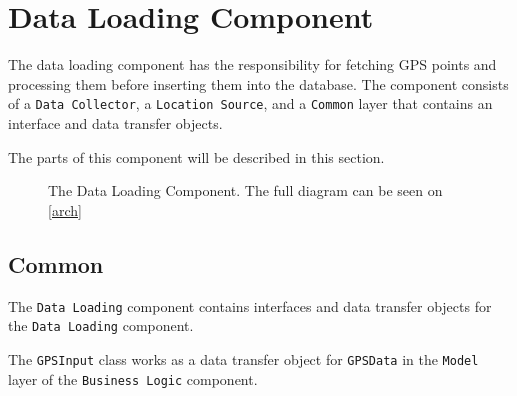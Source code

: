 \section{Data Loading Component}\label{arch:data_loading_component}
The data loading component has the responsibility for fetching GPS points and processing them before inserting them into the database.
The component consists of a \texttt{Data Collector}, a \texttt{Location Source}, and a \texttt{Common} layer that contains an interface and data transfer objects.

The parts of this component will be described in this section.
\begin{figure}[h]
\centering
{}
\caption{The Data Loading Component. The full diagram can be seen on \cref{arch}}
\label{dataloadingcomponent}
\end{figure}

\subsection{Common}
The \texttt{Data Loading} component contains interfaces and data transfer objects for the \texttt{Data Loading} component.

The \lstinline!GPSInput! class works as a data transfer object for \lstinline!GPSData! in the \texttt{Model} layer of the \texttt{Business Logic} component.

